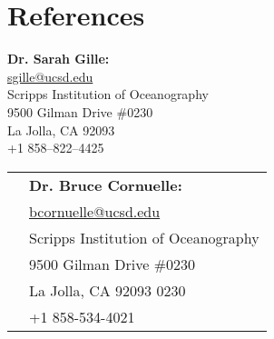 \documentclass[10pt]{article}
\begin{document}
\section*{References}
\vspace{.3cm}
\begin{minipage}[ht]{0.48\textwidth}
\begin{flushleft}
\textbf{Dr. Sarah Gille:} \\
\vspace{.1cm}
\url{sgille@ucsd.edu}\\
\vspace{.2cm}
\small{Scripps Institution of Oceanography}\\
\small{9500 Gilman Drive \#0230} \\
\small{La Jolla, CA 92093} \\
\small{+1 858--822--4425} 
\end{flushleft}
\end{minipage}
\hfill
\begin{minipage}[ht]{0.48\textwidth}
\vspace{.1cm}
\begin{flushright}
\begin{tabular}{l  l }
& \textbf{Dr. Bruce Cornuelle:} \\[5pt]
& \url{bcornuelle@ucsd.edu} \\[5pt]
&\small{Scripps Institution of Oceanography}\\
&\small{9500 Gilman Drive \#0230} \\
&\small{La Jolla, CA 92093 0230} \\
&\small{+1 858-534-4021} 
\end{tabular}
\end{flushright}
\end{minipage}
\end{document}
